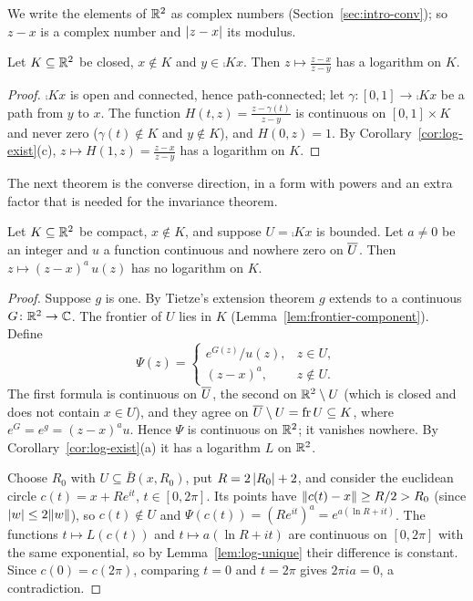 We write the elements of $\mathbb{R}^2$ as complex numbers (Section~\ref{sec:intro-conv}); so $z-x$ is a
complex number and $\left\lvert z-x\right\rvert$ its modulus.

\begin{theorem}\label{thm:log-same-comp}
Let $K\subseteq\mathbb{R}^2$ be closed, $x\notin K$ and $y\in\comp Kx$. Then $z\mapsto\frac{z-x}{z-y}$ has
a logarithm on $K$.
\end{theorem}

\begin{proof}
$\comp Kx$ is open and connected, hence path-connected; let $\gamma\colon[0,1]\to\comp Kx$ be a path
from $y$ to $x$. The function $H(t,z)=\frac{z-\gamma(t)}{z-y}$ is continuous on $[0,1]\times K$ and
never zero ($\gamma(t)\notin K$ and $y\notin K$), and $H(0,z)=1$. By
Corollary~\ref{cor:log-exist}(c), $z\mapsto H(1,z)=\frac{z-x}{z-y}$ has a logarithm on $K$.
\end{proof}


The next theorem is the converse direction, in a form with powers and an extra factor that is
needed for the invariance theorem.

\begin{theorem}\label{thm:nolog-bounded}
Let $K\subseteq\mathbb{R}^2$ be compact, $x\notin K$, and suppose $U=\comp Kx$ is bounded. Let $a\neq0$ be an
integer and $u$ a function continuous and nowhere zero on $\overline{U}$. Then
$z\mapsto(z-x)^a\,u(z)$ has no logarithm on $K$.
\end{theorem}

\begin{proof}
Suppose $g$ is one. By Tietze's extension theorem $g$ extends to a continuous $G\colon\mathbb{R}^2\to\mathbb{C}$.
The frontier of $U$ lies in $K$ (Lemma~\ref{lem:frontier-component}). Define
\[
\Psi(z)=\begin{cases} e^{G(z)}/u(z), & z\in U,\\ (z-x)^a, & z\notin U.\end{cases}
\]
The first formula is continuous on $\overline{U}$, the second on $\mathbb{R}^2\setminus U$ (which is closed and
does not contain $x\in U$), and they agree on $\overline{U}\setminus U=\operatorname{fr}U\subseteq K$, where
$e^{G}=e^{g}=(z-x)^au$. Hence $\Psi$ is continuous on $\mathbb{R}^2$; it vanishes nowhere. By
Corollary~\ref{cor:log-exist}(a) it has a logarithm $L$ on $\mathbb{R}^2$.

Choose $R_0$ with $U\subseteq\bar B(x,R_0)$, put $R=2\left\lvert R_0\right\rvert+2$, and consider the euclidean circle
$c(t)=x+Re^{it}$, $t\in[0,2\pi]$. Its points have $\lVert c(t)-x\rVert\ge R/2>R_0$ (since $\left\lvert w\right\rvert\le2\lVert w\rVert$), so $c(t)\notin U$ and $\Psi(c(t))=(Re^{it})^a=e^{a(\ln R+it)}$. The functions $t\mapsto L(c(t))$
and $t\mapsto a(\ln R+it)$ are continuous on $[0,2\pi]$ with the same exponential, so by
Lemma~\ref{lem:log-unique} their difference is constant. Since $c(0)=c(2\pi)$, comparing $t=0$ and
$t=2\pi$ gives $2\pi i a=0$, a contradiction.
\end{proof}

